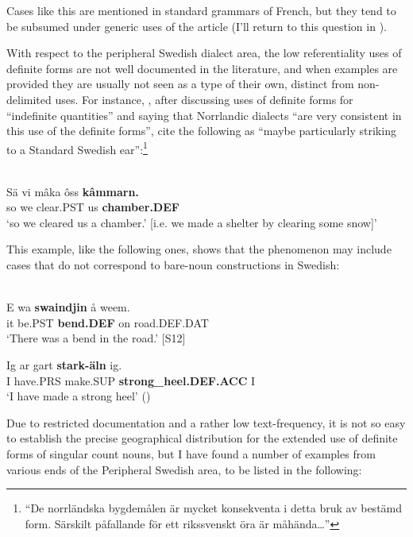 \z

Cases like this are mentioned in standard grammars of French, but they tend to be subsumed under generic uses of the article (I’ll return to this question in ). 

With respect to the peripheral Swedish dialect area, the low referentiality uses of definite forms are not well documented in the literature, and when examples are provided they are usually not seen as a type of their own, distinct from non-delimited uses. For instance, \citet[282]{ÅgrenEtAl1954}, after discussing uses of definite forms for “indefinite quantities” and saying that Norrlandic dialects “are very consistent in this use of the definite forms”, cite the following as “maybe particularly striking to a Standard Swedish ear”:\footnote{ “De norrländska bygdemålen är mycket konsekventa i detta bruk av bestämd form. Särskilt påfallande för ett rikssvenskt öra är måhända…”} 

\ea \label{} 
\\
\gll Sä  vi  mâka  ôss  \textbf{kâmmarn.}\\
so  we  clear.PST  us  \textbf{chamber.DEF}\\
\glt ‘so we cleared us a chamber.’ [i.e. we made a shelter by clearing some snow]’

\z

This example, like the following ones, shows that the phenomenon may include cases that do not correspond to bare-noun constructions in Swedish: 

\ea\label{}
\\
\gll E  wa  \textbf{swaindjin} å  weem.\\
it  be.PST  \textbf{bend.DEF} on  road.DEF.DAT\\
\glt ‘There was a bend in the road.’ [S12]

\z

\ea
\gll Ig  ar  gart  \textbf{stark-äln} ig.\\
I   have.PRS  make.SUP  \textbf{strong\_heel.DEF.ACC} I\\
\glt ‘I have made a strong heel’ (\citet[95]{Levander1909})

\z

Due to restricted documentation and a rather low text-frequency, it is not so easy to establish the precise geographical distribution for the extended use of definite forms of singular count nouns, but I have found a number of examples from various ends of the Peripheral Swedish area, to be listed in the following: 

